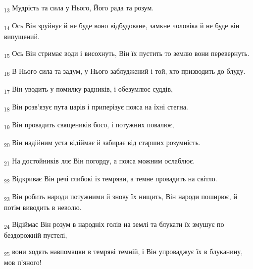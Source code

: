 \begin{tcolorbox}
\textsubscript{13} Мудрість та сила у Нього, Його рада та розум.
\end{tcolorbox}
\begin{tcolorbox}
\textsubscript{14} Ось Він зруйнує й не буде воно відбудоване, замкне чоловіка й не буде він випущений.
\end{tcolorbox}
\begin{tcolorbox}
\textsubscript{15} Ось Він стримає води і висохнуть, Він їх пустить то землю вони перевернуть.
\end{tcolorbox}
\begin{tcolorbox}
\textsubscript{16} В Нього сила та задум, у Нього заблуджений і той, хто призводить до блуду.
\end{tcolorbox}
\begin{tcolorbox}
\textsubscript{17} Він уводить у помилку радників, і обезумлює суддів,
\end{tcolorbox}
\begin{tcolorbox}
\textsubscript{18} Він розв'язує пута царів і приперізує пояса на їхні стегна.
\end{tcolorbox}
\begin{tcolorbox}
\textsubscript{19} Він провадить священиків босо, і потужних повалює,
\end{tcolorbox}
\begin{tcolorbox}
\textsubscript{20} Він надійним уста відіймає й забирає від старших розумність.
\end{tcolorbox}
\begin{tcolorbox}
\textsubscript{21} На достойників ллє Він погорду, а пояса можним ослаблює.
\end{tcolorbox}
\begin{tcolorbox}
\textsubscript{22} Відкриває Він речі глибокі із темряви, а темне провадить на світло.
\end{tcolorbox}
\begin{tcolorbox}
\textsubscript{23} Він робить народи потужними й знову їх нищить, Він народи поширює, й потім виводить в неволю.
\end{tcolorbox}
\begin{tcolorbox}
\textsubscript{24} Відіймає Він розум в народніх голів на землі та блукати їх змушує по бездорожній пустелі,
\end{tcolorbox}
\begin{tcolorbox}
\textsubscript{25} вони ходять навпомацки в темряві темній, і Він упроваджує їх в блуканину, мов п'яного!
\end{tcolorbox}
